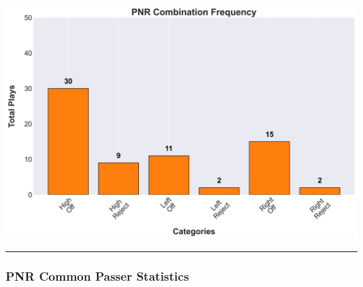 \documentclass[a4paper,12pt]{article}
\begin{document}
\begin{table}[H]
{\begin{minipage}[t]{0.6\textwidth}
{\begin{tabular}
            \bottomrule
        \end{tabular}
        } %
    \end{minipage}
    } %
    \hfill %
    \begin{minipage}[c]{0.35\textwidth} %
        \flushright
        \includegraphics[width=\textwidth, height=.14\textheight]{images/PNR_Combination_Freq.png} %
    \end{minipage}
\end{table}

\vspace{-1em} %
\hrule height 1pt width 1\textwidth %
\vspace{1em} %

\subsubsection{PNR Common Passer Statistics}
\end{document}
